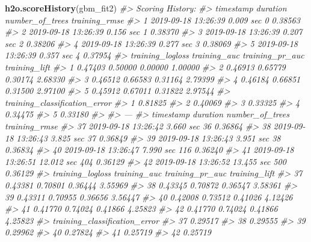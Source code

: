 \documentclass[]{book}
\newenvironment{Shaded}{\begin{snugshade}}{\end{snugshade}}
\newcommand{\CommentTok}[1]{\textcolor[rgb]{0.56,0.35,0.01}{\textit{#1}}}
\newcommand{\KeywordTok}[1]{\textcolor[rgb]{0.13,0.29,0.53}{\textbf{#1}}}
\newcommand{\NormalTok}[1]{#1}
\begin{document}
\begin{Shaded}
\begin{Highlighting}[]
\KeywordTok{h2o.scoreHistory}\NormalTok{(gbm_fit2)}
\CommentTok{#> Scoring History: }
\CommentTok{#>             timestamp   duration number_of_trees training_rmse}
\CommentTok{#> 1 2019-09-18 13:26:39  0.009 sec               0       0.38563}
\CommentTok{#> 2 2019-09-18 13:26:39  0.156 sec               1       0.38370}
\CommentTok{#> 3 2019-09-18 13:26:39  0.207 sec               2       0.38206}
\CommentTok{#> 4 2019-09-18 13:26:39  0.277 sec               3       0.38069}
\CommentTok{#> 5 2019-09-18 13:26:39  0.357 sec               4       0.37954}
\CommentTok{#>   training_logloss training_auc training_pr_auc training_lift}
\CommentTok{#> 1          0.47403      0.50000         0.00000       1.00000}
\CommentTok{#> 2          0.46913      0.65779         0.30174       2.68330}
\CommentTok{#> 3          0.46512      0.66583         0.31164       2.79399}
\CommentTok{#> 4          0.46184      0.66851         0.31500       2.97100}
\CommentTok{#> 5          0.45912      0.67011         0.31822       2.97544}
\CommentTok{#>   training_classification_error}
\CommentTok{#> 1                       0.81825}
\CommentTok{#> 2                       0.40069}
\CommentTok{#> 3                       0.33325}
\CommentTok{#> 4                       0.34475}
\CommentTok{#> 5                       0.33180}
\CommentTok{#> }
\CommentTok{#> ---}
\CommentTok{#>              timestamp   duration number_of_trees training_rmse}
\CommentTok{#> 37 2019-09-18 13:26:42  3.660 sec              36       0.36864}
\CommentTok{#> 38 2019-09-18 13:26:43  3.825 sec              37       0.36849}
\CommentTok{#> 39 2019-09-18 13:26:43  3.951 sec              38       0.36834}
\CommentTok{#> 40 2019-09-18 13:26:47  7.990 sec             116       0.36240}
\CommentTok{#> 41 2019-09-18 13:26:51 12.012 sec             404       0.36129}
\CommentTok{#> 42 2019-09-18 13:26:52 13.455 sec             500       0.36129}
\CommentTok{#>    training_logloss training_auc training_pr_auc training_lift}
\CommentTok{#> 37          0.43381      0.70801         0.36444       3.55969}
\CommentTok{#> 38          0.43345      0.70872         0.36547       3.58361}
\CommentTok{#> 39          0.43311      0.70955         0.36656       3.56447}
\CommentTok{#> 40          0.42008      0.73512         0.41026       4.12426}
\CommentTok{#> 41          0.41770      0.74024         0.41866       4.25823}
\CommentTok{#> 42          0.41770      0.74024         0.41866       4.25823}
\CommentTok{#>    training_classification_error}
\CommentTok{#> 37                       0.29517}
\CommentTok{#> 38                       0.29555}
\CommentTok{#> 39                       0.29962}
\CommentTok{#> 40                       0.27824}
\CommentTok{#> 41                       0.25719}
\CommentTok{#> 42                       0.25719}
\end{Highlighting}
\end{Shaded}
\end{document}
